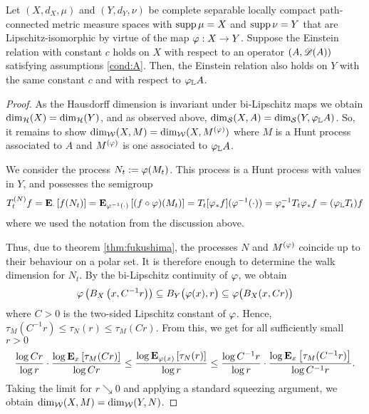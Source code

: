 \begin{prop}\label{prop:mmiso}
  Let $(X,d_X,\mu)$ and $(Y,d_Y,\nu)$ be complete separable locally compact path-connected metric measure spaces with $\supp\mu=X$ and $\supp\nu=Y$ that are Lipschitz-isomorphic by virtue of the map $\gp:X\to Y$. Suppose the Einstein relation with constant $c$ holds on $X$ with respect to an operator $(A,\scD(A))$ satisfying assumptions \ref{cond:A}. Then, the Einstein relation also holds on $Y$ with the same constant $c$ and with respect to $\gp_{\IL} A$.
\end{prop}
\begin{proof}
  As the Hausdorff dimension is invariant under bi-Lipschitz maps we obtain $\dimh(X)=\dimh(Y)$, and as observed above, $\dims(X,A)=\dims(Y,\gp_{\IL} A)$. So, it remains to show $\dimw(X,M)=\dimw(X,M^{(\gp)})$ where $M$ is a Hunt process associated to $A$ and $M^{(\gp)}$ is one associated to $\gp_{\IL} A$. 
  
  We consider the process $N_t:=\gp(M_t)$. This process is a Hunt process with values in $Y$, and possesses the semigroup
  \[
    T_t^{(N)}f
    =\PTEp{f(N_t)}{\cdot}
    =\PTEp{(f\circ\gp)(M_t)}{\gp^{-1}(\cdot)}
    =T_t[\gp_*f](\gp^{-1}(\cdot))
    =\gp_*^{-1}T_t\gp_* f
    =(\gp_{\IL} T_t)f
  \]
  where we used the notation from the discussion above. 
  
  Thus, due to theorem \ref{thm:fukushima}, the processes $N$ and $M^{(\gp)}$ coincide up to their behaviour on a polar set. It is therefore enough to determine the walk dimension for $N_t$. By the bi-Lipschitz continuity of $\gp$, we obtain 
  \[
    \gp\left(B_X\left(x,C^{-1}r\right)\right)
    \ssq B_Y\big(\gp(x),r\big) 
    \ssq \gp\big(B_X(x,Cr)\big)
  \]
  where $C>0$ is the two-sided Lipschitz constant of $\gp$. Hence, $\tau_M(C^{-1}r)\leq \tau_N(r)\leq \tau_M(Cr)$. From this, we get for all sufficiently small $r>0$
  \[
    \frac{\log Cr}{\log r}
     \cdot\frac{\log \PTEp{\tau_M(Cr)}{x}}{\log Cr}
    \leq \frac{\log \PTEp{\tau_N(r)}{\gp(x)}}{\log r}
    \leq \frac{\log C^{-1}r}{\log r}
     \cdot\frac{\log \PTEp{\tau_M(C^{-1}r)}{x}}{\log C^{-1}r}.
  \]
  Taking the limit for $r\searrow0$ and applying a standard squeezing argument, we obtain $\dimw(X,M)=\dimw(Y,N)$. 
\end{proof}
